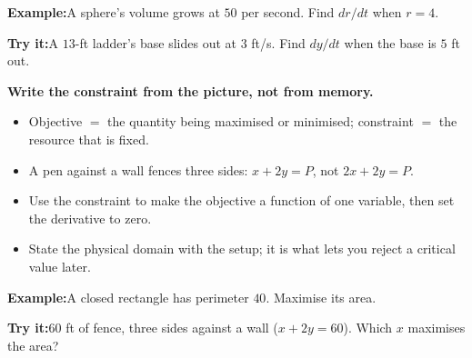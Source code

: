 \documentclass[12pt]{article}
\begin{document}
\begin{examplebox}
\textbf{Example:}\quad A sphere's volume grows at $50$ per second. Find $dr/dt$ when $r = 4$.
\end{examplebox}

\begin{tryitbox}
\textbf{Try it:}\quad A $13$-ft ladder's base slides out at $3$ ft/s. Find $dy/dt$ when the base is $5$ ft out.\\[2pt]
\end{tryitbox}


\begin{formulabox}
\textbf{Write the constraint from the picture, not from memory.}
\begin{itemize}[leftmargin=0.8cm, itemsep=0pt, topsep=1pt]
  \item Objective $=$ the quantity being maximised or minimised; constraint $=$ the resource that is fixed.
  \item A pen against a wall fences three sides: $x + 2y = P$, not $2x + 2y = P$.
  \item Use the constraint to make the objective a function of one variable, then set the derivative to zero.
  \item State the physical domain with the setup; it is what lets you reject a critical value later.
\end{itemize}
\end{formulabox}

\begin{examplebox}
\textbf{Example:}\quad A closed rectangle has perimeter $40$. Maximise its area.
\end{examplebox}

\begin{tryitbox}
\textbf{Try it:}\quad $60$ ft of fence, three sides against a wall ($x + 2y = 60$). Which $x$ maximises the area?\\[2pt]
\end{tryitbox}
\end{document}
